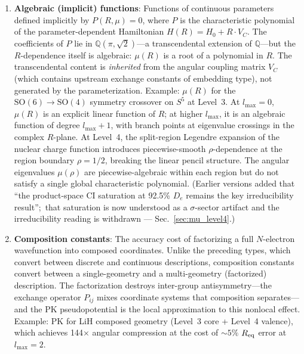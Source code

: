 \documentclass[aps,pra,twocolumn,superscriptaddress,longbibliography]{revtex4-2}
\begin{document}
\begin{enumerate}
  \item \textbf{Algebraic (implicit) functions}: Functions of
    continuous parameters defined implicitly by $P(R,\mu) = 0$,
    where $P$ is the characteristic polynomial of the
    parameter-dependent Hamiltonian $H(R) = H_0 + R \cdot V_C$.
    The coefficients of $P$ lie in $\mathbb{Q}(\pi, \sqrt{2})$---a
    transcendental extension of $\mathbb{Q}$---but the $R$-dependence
    itself is algebraic: $\mu(R)$ is a root of a polynomial in $R$.
    The transcendental content is \emph{inherited} from the angular
    coupling matrix $V_C$ (which contains upstream exchange constants
    of embedding type), not generated by the parameterization.
    Example: $\mu(R)$ for the $\mathrm{SO}(6) \to \mathrm{SO}(4)$
    symmetry crossover on $S^5$ at Level~3.  At $l_{\max} = 0$,
    $\mu(R)$ is an explicit linear function of $R$; at higher
    $l_{\max}$, it is an algebraic function of degree $l_{\max}+1$,
    with branch points at eigenvalue crossings in the complex
    $R$-plane.  At Level~4, the split-region Legendre expansion of
    the nuclear charge function introduces piecewise-smooth
    $\rho$-dependence at the region boundary $\rho = 1/2$, breaking
    the linear pencil structure. The angular eigenvalues $\mu(\rho)$
    are piecewise-algebraic within each region but do not satisfy a
    single global characteristic polynomial. (Earlier versions added
    that ``the product-space CI saturation at 92.5\% $D_e$ remains the
    key irreducibility result'';\ that saturation is now understood as a
    $\sigma$-sector artifact and the irreducibility reading is withdrawn
    --- Sec.~\ref{sec:mu_level4}.)

  \item \textbf{Composition constants}: The accuracy cost of
    factorizing a full $N$-electron wavefunction into composed
    coordinates.  Unlike the preceding types, which convert between
    discrete and continuous descriptions, composition constants
    convert between a single-geometry and a multi-geometry
    (factorized) description.  The factorization destroys inter-group
    antisymmetry---the exchange operator $P_{ij}$ mixes coordinate
    systems that composition separates---and the PK pseudopotential
    is the local approximation to this nonlocal effect.  Example:
    PK for LiH composed geometry (Level~3 core + Level~4 valence),
    which achieves 144$\times$ angular compression at the cost of
    ${\sim}5\%$ $R_{\rm eq}$ error at $l_{\max} = 2$.


\end{enumerate}
\end{document}
